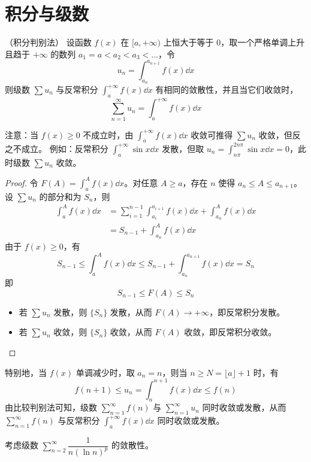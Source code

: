 \section{积分与级数}
\begin{proposition}（积分判别法）
	设函数 $f(x)$ 在 $[a, +\infty)$ 上恒大于等于 $0$，取一个严格单调上升且趋于 $+\infty$ 的数列 $a_1 = a < a_2 < a_3 < \dots$，令
	\[
	u_n = \int_{a_n}^{a_{n+1}} f(x) \dd x
	\]
	则级数 $\sum u_n$ 与反常积分 $\displaystyle\int_{a}^{+\infty} f(x) \dd x$ 有相同的敛散性，并且当它们收敛时，
	\[
	\sum_{n=1}^{\infty} u_n = \int_{a}^{+\infty} f(x) \dd x
	\]
\end{proposition}



注意：当 $f(x) \ge 0$ 不成立时，由 $\displaystyle\int_{a}^{+\infty} f(x) \dd x$ 收敛可推得 $\sum u_n$ 收敛，但反之不成立。
例如：反常积分 $\displaystyle\int_{a}^{+\infty} \sin x \dd x$ 发散，但取 $u_n = \displaystyle\int_{n\pi}^{2n\pi} \sin x \dd x = 0$，此时级数 $\sum u_n$ 收敛。
\begin{proof}
	令 $F(A) = \displaystyle\int_{a}^{A} f(x) \dd x$。对任意 $A \ge a$，存在 $n$ 使得 $a_n \le A \le a_{n+1}$。设 $\sum u_n$ 的部分和为 $S_n$，则
	\begin{align*}
		\int_{a}^{A} f(x) \dd x
		&= \sum_{i=1}^{n-1} \int_{a_i}^{a_{i+1}} f(x) \dd x + \int_{a_n}^{A} f(x) \dd x \\
		&= S_{n-1} + \int_{a_n}^{A} f(x) \dd x
	\end{align*}
	由于 $f(x) \ge 0$，有
	\[
	S_{n-1} \le \int_{a}^{A} f(x) \dd x \le S_{n-1} + \int_{a_n}^{a_{n+1}} f(x) \dd x = S_n
	\]
	即
	\[
	S_{n-1} \le F(A) \le S_n
	\]
	\begin{itemize}
		\item 若 $\sum u_n$ 发散，则 $\{S_n\}$ 发散，从而 $F(A) \to +\infty$，即反常积分发散。
		\item 若 $\sum u_n$ 收敛，则 $\{S_n\}$ 收敛，从而 $F(A)$ 收敛，即反常积分收敛。
	\end{itemize}
	
	
	
\end{proof}
特别地，当 $f(x)$ 单调减少时，取 $a_n = n$，则当 $n \ge N = \lfloor a \rfloor + 1$ 时，有
\[
f(n+1) \le u_n = \int_{n}^{n+1} f(x) \dd x \le f(n)
\]
由比较判别法可知，级数 $\sum_{n=1}^{\infty} f(n)$ 与 $\sum_{n=1}^{\infty} u_n$ 同时收敛或发散，从而 $\sum_{n=1}^{\infty} f(n)$ 与反常积分 $\displaystyle\int_{a}^{+\infty} f(x) \dd x$ 同时收敛或发散。
\begin{example}
		考虑级数 $\sum_{n=2}^{\infty} \dfrac{1}{n(\ln n)^p}$ 的敛散性。
\end{example}


